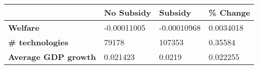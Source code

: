 \begin{tabular}{|l|l|l|l|}
\hline
&\textbf{No Subsidy}&\textbf{Subsidy}&\textbf{\% Change}\\\hline
\textbf{Welfare}&-0.00011005&-0.00010968&0.0034018\\\hline
\textbf{\# technologies}&79178&107353&0.35584\\\hline
\textbf{Average GDP growth}&0.021423&0.0219&0.022255\\\hline
\end{tabular}
